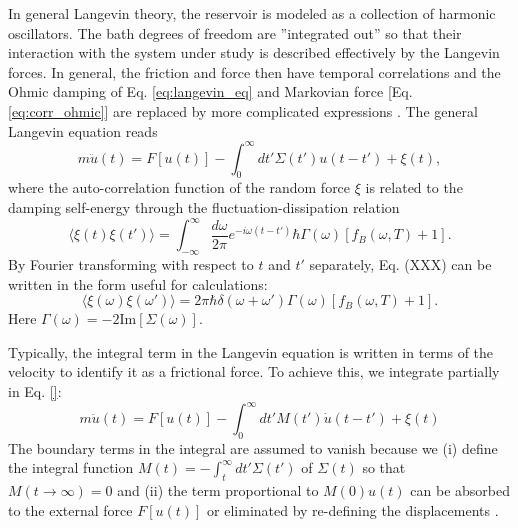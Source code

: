 In general Langevin theory, the reservoir is modeled as a collection of harmonic oscillators. The bath degrees of freedom are ''integrated out'' so that their interaction with the system under study is described effectively by the Langevin forces. In general, the friction and force then have temporal correlations and the Ohmic damping of Eq. \eqref{eq:langevin_eq} and Markovian force [Eq. \eqref{eq:corr_ohmic}] are replaced by more complicated expressions \cite{weiss}. The general Langevin equation reads \cite{dhar06}
\begin{equation}
 m\ddot{u}(t) =  F[u(t)] - \int_{0}^{\infty}dt' \Sigma(t') {u}(t-t') + \xi(t),
\end{equation}
where the auto-correlation function of the random force $\xi$ is related to the damping self-energy through the fluctuation-dissipation relation
\begin{equation}
 \langle \xi(t)\xi(t') \rangle = \int_{-\infty}^{\infty} \frac{d\omega}{2\pi} e^{-i\omega(t-t')} \hbar \Gamma(\omega) [f_B(\omega,T)+1].
\end{equation}
By Fourier transforming with respect to $t$ and $t'$ separately, Eq. (XXX) can be written in the form useful for calculations:
\begin{equation}
  \langle \xi(\omega)\xi(\omega') \rangle = 2\pi\hbar\delta(\omega+\omega') \Gamma(\omega) \left[f_B(\omega,T)+1 \right].
\end{equation}
Here $\Gamma(\omega)=-2\textrm{Im}[\Sigma(\omega)]$.

Typically, the integral term in the Langevin equation is written in terms of the velocity to identify it as a frictional force. To achieve this, we integrate partially in Eq. \eqref{}:
\begin{equation}
 m\ddot{u}(t) =  F[u(t)] - \int_{0}^{\infty}dt' M(t')\dot{u}(t-t') + \xi(t)
\end{equation}
The boundary terms in the integral are assumed to vanish  because we (i) define the integral function $M(t)=-\int_t^{\infty} dt' \Sigma(t')$ of $\Sigma(t)$ so that $M(t\to \infty)=0$ and (ii) the term proportional to $M(0)u(t)$ can be absorbed to the external force $F[u(t)]$ or eliminated by re-defining the displacements \cite{weiss}. 

